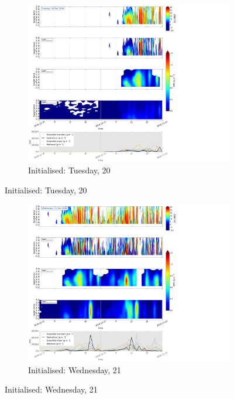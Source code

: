 \begin{figure}[h!]
	\centering
	\begin{subfigure}[t]{0.8\textwidth}
		\includegraphics[trim={2.3cm 17.6cm 27.cm 0.5cm},clip,width=\textwidth]{./fig_SWC/20161220}
		\caption{Initialised: Tuesday, \SI{20}{\dec}}\label{fig:SWC20}
	\end{subfigure}
\end{figure}
\begin{figure}[t]\ContinuedFloat
	\centering
	\centering
	\begin{subfigure}[t]{0.8\textwidth}
		\includegraphics[trim={2.3cm 17.6cm 27.cm 0.5cm},clip,width=\textwidth]{./fig_SWC/20161221}
		\caption{Initialised: Wednesday, \SI{21}{\dec}}\label{fig:SWC21}
	\end{subfigure}
\end{figure}

